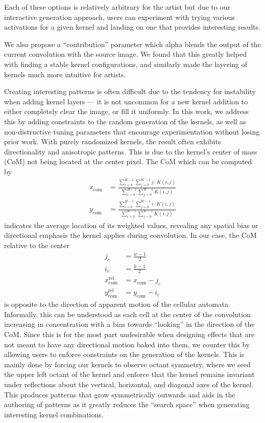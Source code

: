 \documentclass[twocolumn]{article}
\begin{document}
Each of these options is relatively arbitrary for the artist but due to our interactive generation approach, users can experiment with trying various activations for a given kernel and landing on one that provides interesting results.

We also propose a ``contribution'' parameter which alpha blends the output of the current convolution with the source image. We found that this greatly helped with finding a stable kernel configurations, and similarly made the layering of kernels much more intuitive for artists.

Creating interesting patterns is often difficult due to the tendency for instability when adding kernel layers --- it is not uncommon for a new kernel addition to either completely clear the image, or fill it uniformly. In this work, we address this by adding constraints to the random generation of the kernels, as well as non-distructive tuning parameters that encourage experimentation without losing prior work. With purely randomized kernels, the result often exhibits directionality and anisotropic patterns. This is due to the kernel's center of mass (CoM) not being located at the center pixel. The CoM which can be computed by
\begin{align*}
x_{\text{com}} &= \frac{\sum_{i=0}^{H-1} \sum_{j=0}^{W-1} j \cdot K(i, j)}{\sum_{i=0}^{H-1} \sum_{j=0}^{W-1} K(i, j)} \\
y_{\text{com}} &= \frac{\sum_{i=0}^{H-1} \sum_{j=0}^{W-1} i \cdot K(i, j)}{\sum_{i=0}^{H-1} \sum_{j=0}^{W-1} K(i, j)}
\end{align*}
indicates the average location of its weighted values, revealing any spatial bias or directional emphasis the kernel applies during convolution. In our case, the CoM relative to the center
\begin{align*}
j_c &= \frac{w - 1}{2} \\
i_c &= \frac{h - 1}{2} \\
x_{\text{com}}^{\text{rel}} &= x_{\text{com}} - j_c \\
y_{\text{com}}^{\text{rel}} &= y_{\text{com}} - i_c
\end{align*}
is opposite to the direction of apparent motion of the cellular automata. Informally, this can be understood as each cell at the center of the convolution increasing in concentration with a bias towards ``looking'' in the direction of the CoM. Since this is for the most part undesirable when designing effects that are not meant to have any directional motion baked into them, we counter this by allowing users to enforce constraints on the generation of the kernels. This is mainly done by forcing our kernels to observe octant symmetry, where we seed the upper left octant of the kernel and enforce that the kernel remains invariant under reflections about the vertical, horizontal, and diagonal axes of the kernel. This produces patterns that grow symmetrically outwards and aids in the authoring of patterns as it greatly reduces the ``search space'' when generating interesting kernel combinations. 
\end{document}
